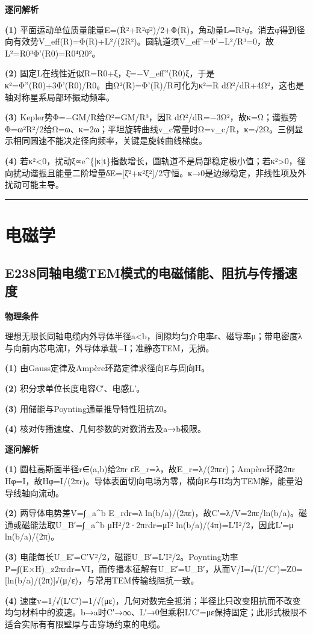 \documentclass[UTF8,a4paper,11pt,oneside,openany]{ctexbook}
\begin{document}
\par\medskip\noindent\textbf{逐问解析}
\par\noindent\textbf{(1)} 平面运动单位质量能量E=(Ṙ²+R²φ̇²)/2+Φ(R)，角动量L=R²φ̇。消去φ̇得到径向有效势V\_eff(R)=Φ(R)+L²/(2R²)。圆轨道须V\_eff'=Φ'−L²/R³=0，故L²=R0³Φ'(R0)=R0⁴Ω0²。
\par\noindent\textbf{(2)} 固定L在线性近似R=R0+ξ，ξ̈=−V\_eff''(R0)ξ，于是κ²=Φ''(R0)+3Φ'(R0)/R0。由Ω²(R)=Φ'(R)/R可化为κ²=R dΩ²/dR+4Ω²，这也是轴对称星系局部环振动频率。
\par\noindent\textbf{(3)} Kepler势Φ=−GM/R给Ω²=GM/R³，因R dΩ²/dR=−3Ω²，故κ=Ω；谐振势Φ=ω²R²/2给Ω=ω、κ=2ω；平坦旋转曲线v\_c常量时Ω=v\_c/R，κ=√2Ω。三例显示相同圆速不能决定径向频率，关键是旋转曲线梯度。
\par\noindent\textbf{(4)} 若κ²<0，扰动ξ∝e\textasciicircum{}\{|κ|t\}指数增长，圆轨道不是局部稳定极小值；若κ²>0，径向扰动谐振且能量二阶增量δE=[ξ̇²+κ²ξ²]/2守恒。κ→0是边缘稳定，非线性项及外扰动可能主导。

\par\bigskip\hrule\bigskip
\chapter{电磁学}
\section*{E238\quad 同轴电缆TEM模式的电磁储能、阻抗与传播速度}
\textbf{物理条件}\par 理想无限长同轴电缆内外导体半径a<b，间隙均匀介电率ε、磁导率μ；带电密度λ与向前内芯电流I，外导体承载−I；准静态TEM，无损。
\par\noindent\textbf{(1)} 由Gauss定律及Ampère环路定律求径向E与周向H。
\par\noindent\textbf{(2)} 积分求单位长度电容C′、电感L′。
\par\noindent\textbf{(3)} 用储能与Poynting通量推导特性阻抗Z0。
\par\noindent\textbf{(4)} 核对传播速度、几何参数的对数消去及a→b极限。

\par\medskip\noindent\textbf{逐问解析}
\par\noindent\textbf{(1)} 圆柱高斯面半径r∈(a,b)给2πr εE\_r=λ，故E\_r=λ/(2πεr)；Ampère环路2πr Hφ=I，故Hφ=I/(2πr)。导体表面切向电场为零，横向E与H均为TEM解，能量沿导线轴向流动。
\par\noindent\textbf{(2)} 两导体电势差V=∫\_a\textasciicircum{}b E\_rdr=λ ln(b/a)/(2πε)，故C′=λ/V=2πε/ln(b/a)。磁通或磁能法取U\_B′=∫\_a\textasciicircum{}b μH²/2·2πrdr=μI² ln(b/a)/(4π)=L′I²/2，因此L′=μ ln(b/a)/(2π)。
\par\noindent\textbf{(3)} 电能每长U\_E′=C′V²/2，磁能U\_B′=L′I²/2。Poynting功率P=∫(E×H)\_z2πrdr=VI，而传播本征解有U\_E′=U\_B′，从而V/I=√(L′/C′)=Z0=[ln(b/a)/(2π)]√(μ/ε)，与常用TEM传输线阻抗一致。
\par\noindent\textbf{(4)} 速度v=1/√(L′C′)=1/√(με)，几何对数完全抵消；半径比只改变阻抗而不改变均匀材料中的波速。b→a时C′→∞、L′→0但乘积L′C′=με保持固定；此形式极限不适合实际有有限壁厚与击穿场约束的电缆。
\end{document}
